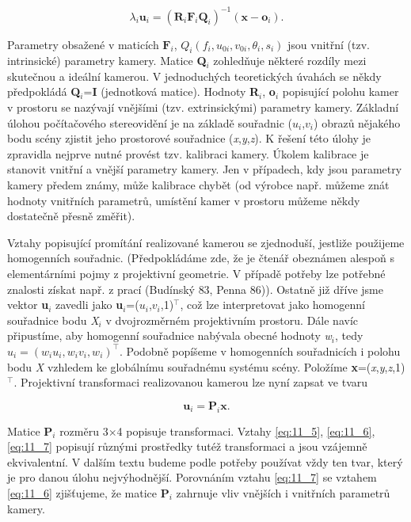 \begin{equation} \label{eq:11_6}
    \lambda_{i} \mathbf{u}_{i} = \left(\mathbf{R}_{i} \mathbf{F}_{i} \mathbf{Q}_{i} \right)^{-1} \left(\mathbf{x} - \mathbf{o}_{i} \right).
\end{equation}

Parametry obsažené v maticích $\mathbf{F}_i$, $Q_{i}(f_i, u_{0i}, v_{0i}, \theta_i, s_i)$ jsou vnitřní (tzv. intrinsické) parametry kamery. Matice \textbf{Q}$_i$ zohledňuje některé rozdíly mezi skutečnou a ideální kamerou. V jednoduchých teoretických úvahách se někdy předpokládá \textbf{Q}$_i$=\textbf{I} (jednotková matice). Hodnoty \textbf{R}$_{i}$, \textbf{o}$_{i}$ popisující polohu kamer v prostoru se nazývají vnějšími (tzv. extrinsickými) parametry kamery. Základní úlohou počítačového stereovidění je na základě souřadnic ($u_i$,$v_i$) obrazů nějakého bodu scény zjistit jeho prostorové souřadnice (\textit{x},\textit{y},\textit{z}). K řešení této úlohy je zpravidla nejprve nutné provést tzv. kalibraci kamery. Úkolem kalibrace je stanovit vnitřní a vnější parametry kamery. Jen v případech, kdy jsou parametry kamery předem známy, může kalibrace chybět (od výrobce např. můžeme znát hodnoty vnitřních parametrů, umístění kamer v prostoru můžeme někdy dostatečně přesně změřit).

Vztahy popisující promítání realizované kamerou se zjednoduší, jestliže použijeme homogenních souřadnic. (Předpokládáme zde, že je čtenář obeznámen alespoň s elementárními pojmy  z projektivní geometrie. V případě potřeby lze potřebné znalosti získat např. z prací (Budínský 83, Penna 86)). Ostatně již dříve jsme vektor \textbf{u}$_{i}$ zavedli jako \textbf{u}$_{i}$=($u_i$,$v_i$,1)$^\top$, což lze interpretovat jako homogenní souřadnice bodu \textit{X}$_i$ v dvojrozměrném projektivním prostoru. Dále navíc připustíme, aby homogenní souřadnice nabývala obecné hodnoty \textit{w}$_i$, tedy $u_{i}=(w_i u_i, w_i v_i, w_i)^\top$. Podobně popíšeme v homogenních souřadnicích i polohu bodu \textit{X} vzhledem ke globálnímu souřadnému systému scény. Položíme \textbf{x}=(\textit{x},\textit{y},\textit{z},1)$^\top$. Projektivní transformaci realizovanou kamerou lze nyní zapsat ve tvaru

\begin{equation} \label{eq:11_7}
    \mathbf{u}_{i} = \mathbf{P}_{i} \mathbf{x}.
\end{equation}

Matice \textbf{P}$_{i}$ rozměru 3$\times$4 popisuje transformaci. Vztahy \eqref{eq:11_5}, \eqref{eq:11_6}, \eqref{eq:11_7} popisují různými prostředky tutéž transformaci a jsou vzájemně ekvivalentní.  V dalším textu budeme podle potřeby používat vždy ten tvar, který je pro danou úlohu nejvýhodnější. Porovnáním vztahu \eqref{eq:11_7} se vztahem \eqref{eq:11_6} zjišťujeme, že matice \textbf{P}$_{i}$ zahrnuje vliv vnějších i vnitřních parametrů kamery.

